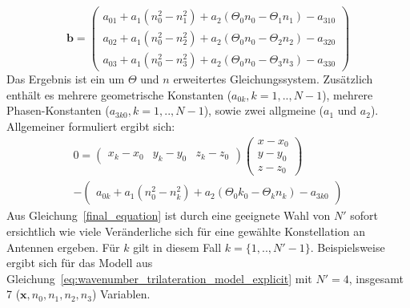 %
\begin{equation}
\mathbf{b}=
\left(
	\begin{array}{c}
		a_{01}+a_1( n_0^2-n_1^2)+a_2(\Theta_0n_0-\Theta_1n_1)-a_{310} \\
		a_{02}+a_1(n_0^2-n_2^2)+a_2(\Theta_0n_0-\Theta_2n_2)-a_{320} \\
		a_{03}+a_1(n_0^2-n_3^2)+a_2(\Theta_0n_0-\Theta_3n_3)-a_{330}
	\end{array}
\right)
\end{equation}
%
Das Ergebnis ist ein um $\Theta$ und $n$ erweitertes Gleichungssystem. Zusätzlich enthält  es mehrere geometrische Konstanten ($a_{0k}, k={1,..,N-1}$), mehrere Phasen-Konstanten ($a_{3k0}, k={1,..,N-1}$), sowie zwei allgmeine ($a_1$ und $a_2$). Allgemeiner formuliert ergibt sich:
%
\begin{multline}\label{final_equation}
0=
\left(
	\begin{array}{ccc}
		x_k-x_0 & y_k-y_0 & z_k-z_0 
	\end{array}
\right)
\left(
   \begin{array}{c}
	   x-x_0\\
	   y-y_0\\
	   z-z_0
   \end{array}
\right) \\
-
\left(
	\begin{array}{c}
		a_{0k}+a_1(n_0^2-n_k^2)+a_2(\Theta_0k_0-\Theta_kn_k)-a_{3k0}
	\end{array}
	\right)
\end{multline}
%
Aus Gleichung~\eqref{final_equation} ist durch eine geeignete Wahl von $N'$ sofort ersichtlich wie viele Veränderliche sich für eine gewählte Konstellation an Antennen ergeben. Für $k$ gilt in diesem Fall $k=\{1,..,N'-1\}$.
%
Beispielsweise ergibt sich für das Modell aus Gleichung~\eqref{eq:wavenumber_trilateration_model_explicit} mit $N'=4$, insgesamt 7 ($\mathbf{x},n_0,n_1,n_2,n_3$) Variablen.

